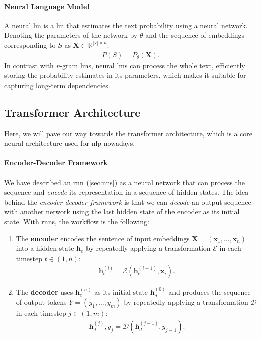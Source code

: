\paragraph{Neural Language Model} A neural \ac{lm} is a \acl{lm} that estimates the text probability using a neural network. Denoting the parameters of the network by $\theta$ and the sequence of embeddings corresponding to $S$ as $\mathbf{X} \in \mathbb{R}^{|V|\times n}$:
\begin{align}
    P(S) = P_\theta(\mathbf{X}).
\end{align}
In contrast with \emph{n}-gram \acp{lm}, neural \acp{lm} can process the whole text, efficiently storing the probability estimates in its parameters, which makes it suitable for capturing long-term dependencies.

\subsection{Transformer Architecture}
\label{sec:transformer}
Here, we will pave our way towards the transformer architecture, which is a core neural architecture used for \ac{nlp} nowadays.

\paragraph{Encoder-Decoder Framework}
We have described an \ac{rnn} (\autoref{sec:nns}) as a neural network that can process the sequence and \emph{encode} its representation in a sequence of hidden states. The idea behind the \emph{encoder-decoder framework} \cite{sutskever2014sequence,cho2014learning} is that we can \emph{decode} an output sequence with another network using the last hidden state of the encoder as its initial state. With \acp{rnn}, the workflow is the following:

\begin{enumerate}
    \item The \textbf{encoder} encodes the sentence of input embeddings $\mathbf{X}= (\mathbf{x}_1, \ldots, \mathbf{x}_n)$ into a hidden state $\mathbf{h}_e$ by repeatedly applying a transformation $\mathcal{E}$ in each timestep $t\in(1,n)$:
          \begin{align}
              \mathbf{h}_e^{(i)} = \mathcal{E}(\mathbf{h}_e^{(i-1)}, \mathbf{x}_i).
          \end{align}
    \item The \textbf{decoder} uses $\mathbf{h}_e^{(n)}$ as its initial state $\mathbf{h}_d^{(0)}$ and produces the sequence of output tokens  $Y = (y_1, \ldots, y_m)$ by repeatedly applying a transformation $\mathcal{D}$ in each timestep $j\in(1,m)$:
          \begin{align}
              \mathbf{h}_d^{(j)}, y_j = \mathcal{D}(\mathbf{h}_d^{(j-1)}, y_{j-1}).
          \end{align}
\end{enumerate}

